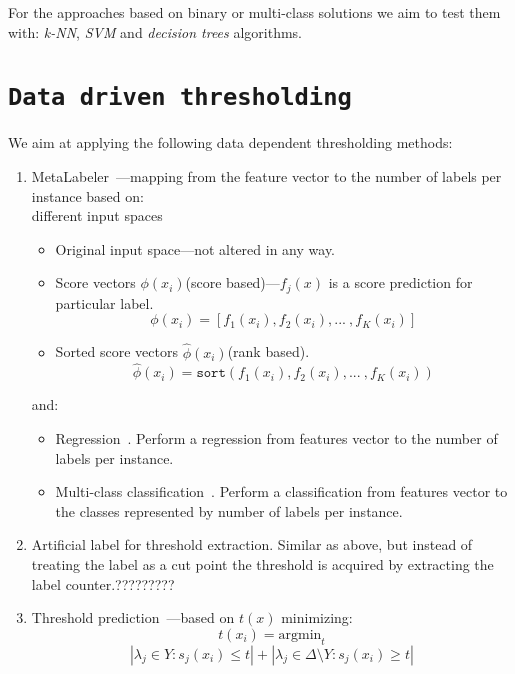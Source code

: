 \documentclass[12pt,a4paper,twocolumn]{article}
\newcommand{\ts}{\textsuperscript}
\begin{document}
For the approaches based on binary or multi-class solutions we aim to test them with: \emph{k-NN}, \emph{SVM} and \emph{decision trees} algorithms.

\section*{\texttt{Data driven thresholding}}
We aim at applying the following data dependent thresholding methods:


\begin{enumerate}
\item MetaLabeler~\cite{Tang:2009:LSM:1526709.1526738}---mapping from the feature vector to the number of labels per instance based on:\\

	different input spaces
	\begin{itemize} %
	\item Original input space---not altered in any way.
	\item Score vectors $\phi(x_i)$(score based)---$f_j(x)$ is a score prediction for particular label.
	$$
	\phi(x_i) = [ f_1(x_i), f_2(x_i), ...\ , f_K(x_i) ]
	$$
	\item Sorted score vectors $\hat{\phi}(x_i)$(rank based).
	$$
	\hat{\phi}(x_i) = \texttt{sort} ( f_1(x_i), f_2(x_i), ...\ , f_K(x_i) )
	$$
	\end{itemize}

	and:
	\begin{itemize} %
	\item Regression~\cite{conf/ictai/IoannouSTV10}. Perform a regression from features vector to the number of labels per instance.
	\item Multi-class classification~\cite{conf/ictai/IoannouSTV10}. Perform a classification from features vector to the classes represented by number of labels per instance.
	\end{itemize}

\item Artificial label for threshold extraction. Similar as above, but instead of treating the label as a cut point the threshold is acquired by extracting the label counter.?????????%
\item Threshold prediction~\cite{Elisseeff01akernel}---based on $t(x)$ minimizing:
	$$
	t(x_i) = \text{argmin}_t $$ $$ | \lambda_j \in Y : s_j(x_i) \leq t | + | \lambda_j \in \Delta \text{\textbackslash{}} Y : s_j(x_i) \geq t |
	$$
\end{enumerate}
\end{document}
